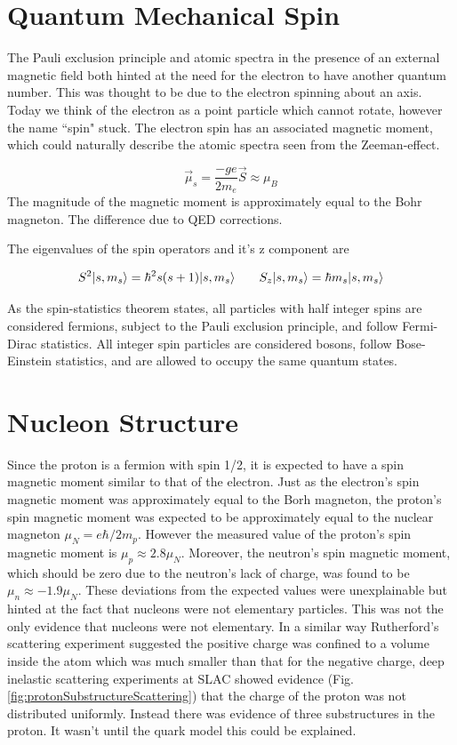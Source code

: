 \documentclass[letterpaper, abstract = on,listof=totoc, bibliography=totoc]{scrreprt}
\DeclarePairedDelimiter\ket{\lvert}{\rangle}
\begin{document}
\section{Quantum Mechanical Spin}

The Pauli exclusion principle and atomic spectra in the presence of an external magnetic field both hinted at the need for the electron to have another quantum number. This was thought to be due to the electron spinning about an axis. Today we think of the electron as a point particle which cannot rotate, however the name ``spin" stuck. The electron spin has an associated magnetic moment, which could naturally describe the atomic spectra seen from the Zeeman-effect.  

\begin{equation}
\vec{\mu}_s = \frac{-ge}{2m_e}\vec{S} \approx \mu_B
\end{equation}
The magnitude of the magnetic moment is approximately equal to the Bohr magneton. The difference due to QED corrections.

The eigenvalues of the spin operators and it's z component are 

\begin{equation}
S^2 \ket{s,m_s} = \hbar^2s(s+1)\ket{s,m_s} \;\;\;\;\;\;\; S_z \ket{s,m_s} = \hbar m_s \ket{s,m_s}
\end{equation}

As the spin-statistics theorem states, all particles with half integer spins are considered fermions, subject to the Pauli exclusion principle, and follow Fermi-Dirac statistics. All integer spin particles are considered bosons, follow Bose-Einstein statistics, and are allowed to occupy the same quantum states. 

\section{Nucleon Structure}

Since the proton is a fermion with spin 1/2, it is expected to have a spin magnetic moment similar to that of the electron. Just as the electron's spin magnetic moment was approximately equal to the Borh magneton, the proton's spin magnetic moment was expected to be approximately equal to the nuclear magneton $\mu_N = e\hbar/2m_p$. However the measured value of the proton's spin magnetic moment is $\mu_p \approx 2.8 \mu_N$. Moreover, the neutron's spin magnetic moment, which should be zero due to the neutron's lack of charge,  was found to be $\mu_n \approx -1.9\mu_N$. These deviations from the expected values were unexplainable but hinted at the fact that nucleons were not elementary particles. This was not the only evidence that nucleons were not elementary.  In a similar way Rutherford's scattering experiment suggested the positive charge was confined to a volume inside the atom which was much smaller than that for the negative charge, deep inelastic scattering experiments at SLAC showed evidence (Fig. \ref{fig:protonSubstructureScattering}) that the charge of the proton was not distributed uniformly. Instead there was evidence of three substructures in the proton. It wasn't until the quark model this could be explained.
\end{document}
